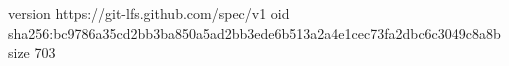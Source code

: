version https://git-lfs.github.com/spec/v1
oid sha256:bc9786a35cd2bb3ba850a5ad2bb3ede6b513a2a4e1cec73fa2dbc6c3049c8a8b
size 703
